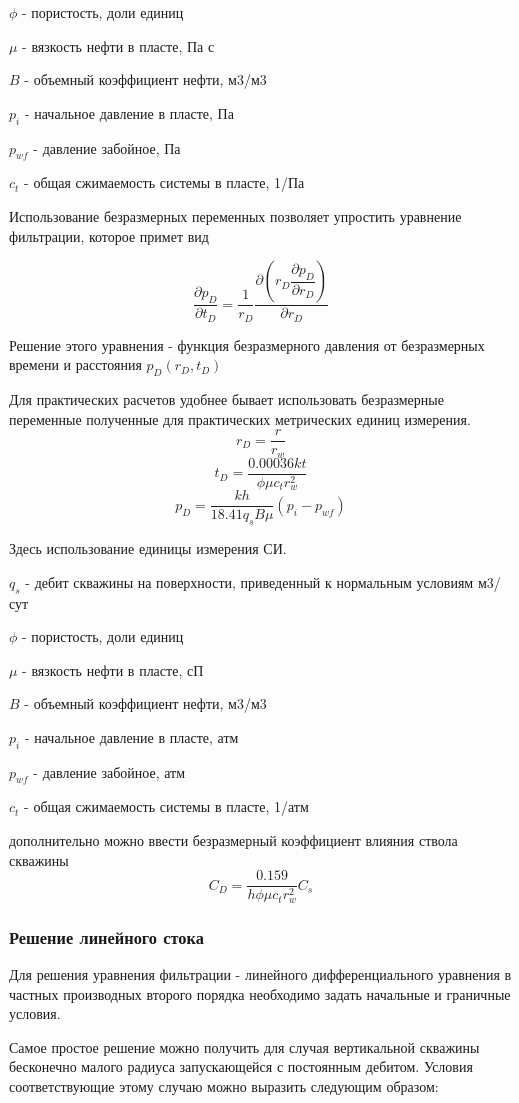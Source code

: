 $\phi$ - пористость, доли единиц

$\mu$ - вязкость нефти в пласте, Па с

$B$ - объемный коэффициент нефти, м3/м3

$p_i$ - начальное давление в пласте, Па

$p_{wf}$ - давление забойное, Па

$c_t$ - общая сжимаемость системы в пласте, 1/Па

Использование безразмерных переменных позволяет упростить уравнение фильтрации, которое примет вид

$$ \frac{\partial p_D}{ \partial t_D} = \frac{1}{r_D} \frac{ \partial{ \left( r_D \dfrac{\partial p_D}{ \partial r_D} \right) } }{ \partial{r_D} } $$

Решение этого уравнения - функция безразмерного давления от безразмерных времени и расстояния $p_D(r_D, t_D) $

Для практических расчетов удобнее бывает использовать безразмерные переменные полученные для практических метрических единиц измерения. 
$$ r_D = \frac{r}{r_w} $$
$$ t_D = \frac{0.00036 kt}{\phi \mu c_t r_w^2}$$
$$ p_D = \frac{kh}{ 18.41 q_s B \mu} \left( p_i - p_{wf} \right) $$

Здесь использование единицы измерения СИ. 

$q_s$ - дебит скважины на поверхности, приведенный к нормальным условиям м3/сут

$\phi$ - пористость, доли единиц

$\mu$ - вязкость нефти в пласте, сП

$B$ - объемный коэффициент нефти, м3/м3

$p_i$ - начальное давление в пласте, атм

$p_{wf}$ - давление забойное, атм

$c_t$ - общая сжимаемость системы в пласте, 1/атм

дополнительно можно ввести безразмерный коэффициент влияния ствола скважины
$$ C_D = \frac{0.159}{ h \phi \mu c_t r_w^2 } C_s $$

\subsubsection{Решение линейного стока}

Для решения уравнения фильтрации - линейного дифференциального уравнения в частных производных второго порядка необходимо задать начальные и граничные условия. 

Самое простое решение можно получить для случая вертикальной скважины бесконечно малого радиуса запускающейся с постоянным дебитом. Условия соответствующие этому случаю можно выразить следующим образом:

